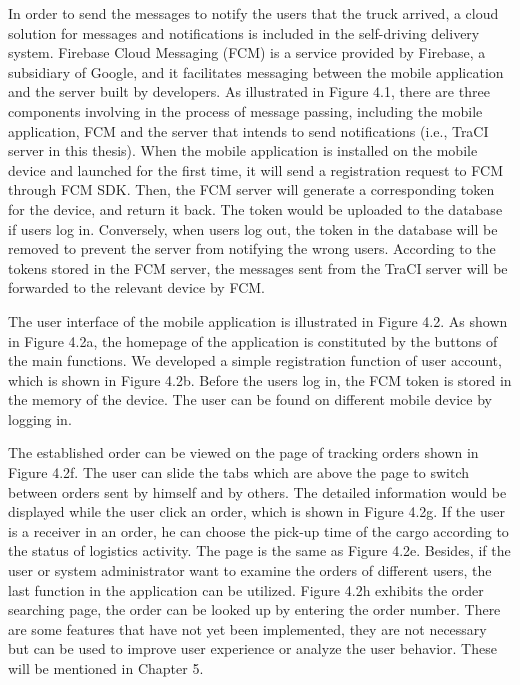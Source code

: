\documentclass[12pt]{ksthesis}
\begin{document}
\begin{thesis}
{In order to send the messages to notify the users that the truck arrived, a cloud solution for messages and notifications is included in the self-driving delivery system. Firebase Cloud Messaging (FCM) is a service provided by Firebase, a subsidiary of Google, and it facilitates messaging between the mobile application and the server built by developers. As illustrated in Figure 4.1, there are three components involving in the process of message passing, including the mobile application, FCM and the server that intends to send notifications (i.e., TraCI server in this thesis). When the mobile application is installed on the mobile device and launched for the first time, it will send a registration request to FCM through FCM SDK. Then, the FCM server will generate a corresponding token for the device, and return it back. The token would be uploaded to the database if users log in. Conversely, when users log out, the token in the database will be removed to prevent the server from notifying the wrong users. According to the tokens stored in the FCM server, the messages sent from the TraCI server will be forwarded to the relevant device by FCM.

The user interface of the mobile application is illustrated in Figure 4.2. As shown in Figure 4.2a, the homepage of the application is constituted by the buttons of the main functions. We developed a simple registration function of user account, which is shown in Figure 4.2b. Before the users log in, the FCM token is stored in the memory of the device. The user can be found on different mobile device by logging in. 

The established order can be viewed on the page of tracking orders shown in Figure 4.2f. The user can slide the tabs which are above the page to switch between orders sent by himself and by others. The detailed information would be displayed while the user click an order, which is shown in Figure 4.2g. If the user is a receiver in an order, he can choose the pick-up time of the cargo according to the status of logistics activity. The page is the same as Figure 4.2e. Besides, if the user or system administrator want to examine the orders of different users, the last function in the application can be utilized. Figure 4.2h exhibits the order searching page, the order can be looked up by entering the order number. There are some features that have not yet been implemented, they are not necessary but can be used to improve user experience or analyze the  user behavior. These will be mentioned in Chapter 5.


}
\end{thesis}
\end{document}
